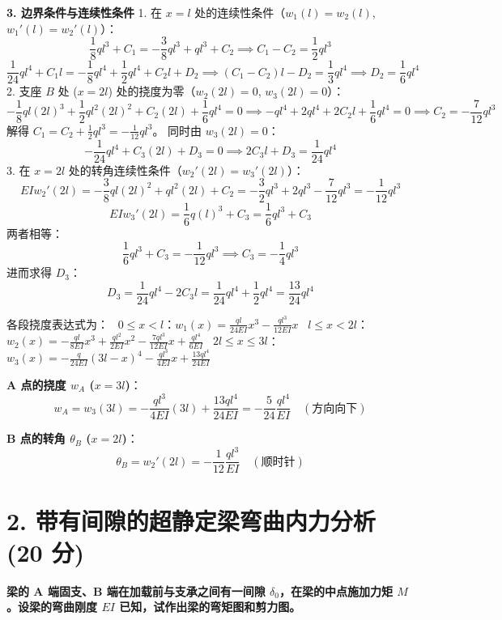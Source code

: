 \documentclass[11pt,a4paper]{ctexrep}
\begin{document}
{\textbf{3. 边界条件与连续性条件}
1. 在 $x=l$ 处的连续性条件（$w_1(l) = w_2(l)$, $w_1'(l) = w_2'(l)$）：
   \[
   \frac{1}{8} ql^3 + C_1 = -\frac{3}{8} ql^3 + ql^3 + C_2 \implies C_1 - C_2 = \frac{1}{2} ql^3
   \]
   \[
   \frac{1}{24} ql^4 + C_1 l = -\frac{1}{8} ql^4 + \frac{1}{2} ql^4 + C_2 l + D_2 \implies (C_1 - C_2)l - D_2 = \frac{1}{3} ql^4 \implies D_2 = \frac{1}{6} ql^4
   \]
2. 支座 $B$ 处 ($x=2l$) 处的挠度为零（$w_2(2l) = 0$, $w_3(2l) = 0$）：
   \[
   -\frac{1}{8} ql (2l)^3 + \frac{1}{2} ql^2 (2l)^2 + C_2 (2l) + \frac{1}{6} ql^4 = 0 \implies -ql^4 + 2ql^4 + 2 C_2 l + \frac{1}{6} ql^4 = 0 \implies C_2 = -\frac{7}{12} ql^3
   \]
   解得 $C_1 = C_2 + \frac{1}{2} ql^3 = -\frac{1}{12} ql^3$。
   同时由 $w_3(2l) = 0$：
   \[
   -\frac{1}{24} q l^4 + C_3 (2l) + D_3 = 0 \implies 2 C_3 l + D_3 = \frac{1}{24} ql^4
   \]
3. 在 $x=2l$ 处的转角连续性条件（$w_2'(2l) = w_3'(2l)$）：
   \[
   EI w_2'(2l) = -\frac{3}{8} ql (2l)^2 + ql^2 (2l) + C_2 = -\frac{3}{2} ql^3 + 2ql^3 - \frac{7}{12} ql^3 = -\frac{1}{12} ql^3
   \]
   \[
   EI w_3'(2l) = \frac{1}{6} q (l)^3 + C_3 = \frac{1}{6} ql^3 + C_3
   \]
   两者相等：
   \[
   \frac{1}{6} ql^3 + C_3 = -\frac{1}{12} ql^3 \implies C_3 = -\frac{1}{4} ql^3
   \]
   进而求得 $D_3$：
   \[
   D_3 = \frac{1}{24} ql^4 - 2 C_3 l = \frac{1}{24} ql^4 + \frac{1}{2} ql^4 = \frac{13}{24} ql^4
   \]

各段挠度表达式为：
\noindent\textbullet\ $0 \le x < l$：$w_1(x) = \frac{ql}{24EI} x^3 - \frac{ql^3}{12EI} x$
\noindent\textbullet\ $l \le x < 2l$：$w_2(x) = -\frac{ql}{8EI} x^3 + \frac{ql^2}{2EI} x^2 - \frac{7ql^3}{12EI} x + \frac{ql^4}{6EI}$
\noindent\textbullet\ $2l \le x \le 3l$：$w_3(x) = -\frac{q}{24EI} (3l-x)^4 - \frac{ql^3}{4EI} x + \frac{13ql^4}{24EI}$

\textbf{A 点的挠度 $w_A$ ($x=3l$)}：
\[
w_A = w_3(3l) = -\frac{ql^3}{4EI} (3l) + \frac{13ql^4}{24EI} = -\frac{5}{24} \frac{q l^4}{EI} \quad (\text{方向向下})
\]

\textbf{B 点的转角 $\theta_B$ ($x=2l$)}：
\[
\theta_B = w_2'(2l) = -\frac{1}{12} \frac{q l^3}{EI} \quad (\text{顺时针})
\]




\section*{2. 带有间隙的超静定梁弯曲内力分析 (20 分)}

\textbf{梁的 A 端固支、B 端在加载前与支承之间有一间隙 $\delta_0$，在梁的中点施加力矩 $M$。设梁的弯曲刚度 $EI$ 已知，试作出梁的弯矩图和剪力图。}

}
\end{document}
